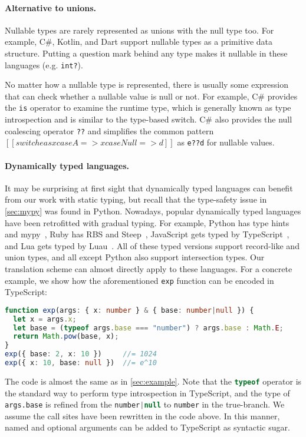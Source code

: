 \paragraph{Alternative to unions.}
Nullable types are rarely represented as unions with the null type too. For
example, C\#, Kotlin, and Dart support nullable types as a primitive data
structure. Putting a question mark behind any type makes it nullable in these
languages (e.g. \lstinline{int?}).

No matter how a nullable type is represented, there is usually some expression
that can check whether a nullable value is null or not. For example, C\#
provides the \lstinline[language={[Sharp]C}]{is} operator to examine the runtime
type, which is generally known as type introspection and is similar to the
type-based switch. C\# also provides the null coalescing operator \lstinline{??}
and simplifies the common pattern $[[switch e as x case A => x case Null => d]]$
as \lstinline{e??d} for nullable values.

\paragraph{Dynamically typed languages.}
It may be surprising at first sight that dynamically typed languages can benefit
from our work with static typing, but recall that the type-safety issue in
\autoref{sec:mypy} was found in Python. Nowadays, popular dynamically typed
languages have been retrofitted with gradual typing. For example, Python has
type hints and mypy~\citep{mypy}, Ruby has RBS and Steep~\citep{steep},
JavaScript gets typed by TypeScript~\citep{typescript}, and Lua gets typed by
Luau~\citep{luau}. All of these typed versions support record-like and union
types, and all except Python also support intersection types. Our translation
scheme can almost directly apply to these languages. For a concrete example, we
show how the aforementioned \lstinline{exp} function can be encoded in
TypeScript:
\begin{lstlisting}[language=TypeScript]
function exp(args: { x: number } & { base: number|null }) {
  let x = args.x;
  let base = (typeof args.base === "number") ? args.base : Math.E;
  return Math.pow(base, x);
}
exp({ base: 2, x: 10 })     //= 1024
exp({ x: 10, base: null })  //= e^10
\end{lstlisting}
The code is almost the same as in \autoref{sec:example}. Note that the
\lstinline[language=TypeScript]{typeof} operator is the standard way to perform
type introspection in TypeScript, and the type of \lstinline{args.base} is
refined from the \lstinline[language=TypeScript]{number|null} to
\lstinline[language=TypeScript]{number} in the true-branch. We assume the call
sites have been rewritten in the code above. In this manner, named and optional
arguments can be added to TypeScript as syntactic sugar.

